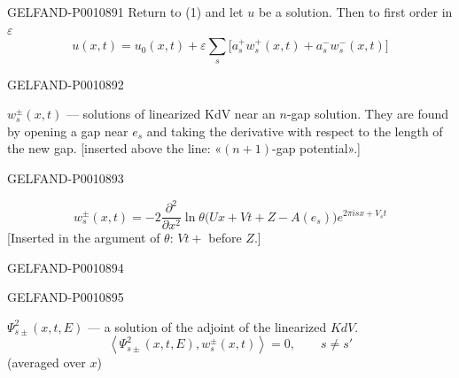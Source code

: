\begin{GelfandAdjacentEvidence}{GELFAND-P001089}{1}
Return to (1) and let $u$ be a solution. Then to first order in $\varepsilon$
\begin{equation*}
u(x,t)=u_0(x,t)+\varepsilon\sum_s
\bigl[a_s^+w_s^+(x,t)+a_s^-w_s^-(x,t)\bigr]
\tag{11}
\end{equation*}
\end{GelfandAdjacentEvidence}
\begin{GelfandAdjacentEvidence}{GELFAND-P001089}{2}


$w_s^\pm(x,t)$ — solutions of linearized KdV near an $n$-gap solution.
They are found by opening a gap near $e_s$ and taking the derivative with respect to the length of the new gap.
[inserted above the line: «$(n+1)$-gap potential».]
\end{GelfandAdjacentEvidence}
\begin{GelfandAdjacentEvidence}{GELFAND-P001089}{3}

\begin{equation*}
w_s^\pm(x,t)=-2\frac{\partial^2}{\partial x^2}
\ln\theta\bigl(Ux+Vt+Z-A(e_s)\bigr)e^{2\pi isx+V_st}
\tag{12}
\end{equation*}
[Inserted in the argument of $\theta$: $Vt+$ before $Z$.]
\end{GelfandAdjacentEvidence}
\begin{GelfandAdjacentEvidence}{GELFAND-P001089}{4}

\end{GelfandAdjacentEvidence}
\begin{GelfandAdjacentEvidence}{GELFAND-P001089}{5}


$\Psi^2_{s\pm}(x,t,E)$ — a solution of the adjoint of the linearized $KdV$.
\begin{equation*}
\left\langle\Psi^2_{s\pm}(x,t,E),w_s^\pm(x,t)\right\rangle=0,
\qquad s\ne s'
\tag{13}
\end{equation*}
(averaged over $x$)
\end{GelfandAdjacentEvidence}
